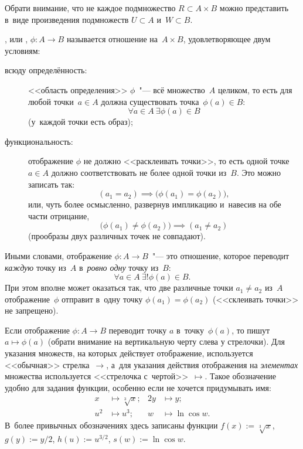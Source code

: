 Обрати внимание, что не каждое подмножество $R \subset A \times B$ можно
представить в~виде произведения подмножеств $U \subset A$ и~$W \subset B$.

\begin{definition}
	, или , $\phi \colon A \to B$ называется
	отношение на~$A \times B$, удовлетворяющее двум условиям:
	\begin{description}
		\item[всюду определённость:] <<область определения>> $\phi$~"--- всё
			множество~$A$ целиком, то есть для любой точки~$a \in A$ должна
			существовать точка~$\phi(a) \in B$:
			\[
				\forall a \in A\ 
				\exists \phi(a) \in B
			\]
			(у~каждой точки есть образ);
		\item[функциональность:] отображение $\phi$ не должно <<расклеивать
			точки>>, то есть одной точке $a \in A$ должно соответствовать не более
			одной точки из~$B$. Это можно записать так:
			\[
				(a_1 = a_2) \implies
				\bigl( \phi(a_1) = \phi(a_2) \bigr)
				,
			\]
			или, чуть более осмысленно, развернув импликацию и~навесив на обе части
			отрицание,
			\[
				\bigl( \phi(a_1) \neq \phi(a_2) \bigr)
				\implies
				(a_1 \neq a_2)
			\]
			(прообразы двух различных точек не совпадают).
	\end{description}
\end{definition}

Иными словами, отображение $\phi \colon A \to B$~"--- это отношение, которое
переводит \emph{каждую} точку из~$A$ в~\emph{ровно одну} точку из~$B$:
\[
	\forall a \in A\ 
	\exists! \phi(a) \in B
	.
\]
При этом вполне может оказаться так, что две различные точки $a_1 \neq a_2$
из~$A$ отображение~$\phi$ отправит в~одну точку $\phi(a_1) = \phi(a_2)$
(<<склеивать точки>> не запрещено).

Если отображение $\phi \colon A \to B$ переводит точку $a$ в~точку~$\phi(a)$,
то пишут $a \mapsto \phi(a)$ (обрати внимание на вертикальную черту слева у
стрелочки). Для указания множеств, на которых действует отображение,
используется <<обычная>> стрелка~$\to$, а~для указания действия отображения на
\emph{элементах} множества используется <<стрелочка с~чертой>>~$\mapsto$. Такое
обозначение удобно для задания функции, особенно если не хочется придумывать
имя:
\begin{align*}
	x &\mapsto \sqrt[3]{x};
	&
	2y &\mapsto y;
	\\
	u^2 &\mapsto u^3;
	&
	w &\mapsto \ln{\cos{w}}.
\end{align*}
В~более привычных обозначениях здесь записаны функции $f(x) := \sqrt[3]{x}$,
$g(y) := y/2$, $h(u) := u^{3/2}$, $s(w) := \ln{\cos{w}}$.

